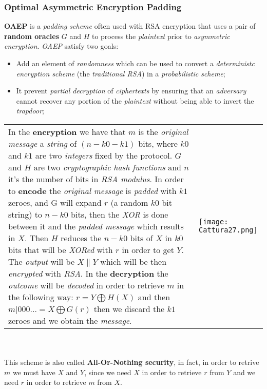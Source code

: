 \documentclass{article}
\begin{document}
\subsubsection{Optimal Asymmetric Encryption Padding}
\textbf{OAEP} is a \emph{padding scheme} often used with RSA encryption that uses a pair of \textbf{random oracles} $G$ and $H$ to process the \emph{plaintext} prior to \emph{asymmetric encryption}. \emph{OAEP} satisfy two goals:
\begin{itemize}
\item Add an element of \emph{randomness} which can be used to convert a \emph{deterministc encryption scheme} (the \emph{traditional RSA}) in a \emph{probabilistic scheme};
\item It prevent \emph{partial decryption} of \emph{ciphertexts} by ensuring that an \emph{adversary} cannot recover any portion of the \emph{plaintext} without being able to invert the \emph{trapdoor};
\end{itemize}
\begin{tabular}{C{10cm}  L{10.5cm}}
In the \textbf{encryption} we have that $m$ is the \emph{original message} a \emph{string} of $(n-k0-k1)$ bits, where $k0$ and $k1$ are two \emph{integers} fixed by the protocol. $G$ and $H$ are two \emph{cryptographic hash functions} and $n$ it's the number of bits in \emph{RSA modulus}. In order to \textbf{encode} the \emph{original message} is \emph{padded} with $k1$ zeroes, and G will expand $r$ (a random $k0$ bit string) to $n-k0$ bits, then the \emph{XOR} is done between it and the \emph{padded message} which results in $X$. Then $H$ reduces the $n-k0$ bits of $X$ in $k0$ bits that will be \emph{XORed} with $r$ in order to get $Y$. The \emph{output} will be $X\parallel Y$ which will be then \emph{encrypted} with \emph{RSA}. In the \textbf{decryption} the \emph{outcome} will be \emph{decoded} in order to retrieve $m$ in the following way: $r= Y \bigoplus H(X)$ and then $m |000... = X \bigoplus G(r)$ then we discard the $k1$ zeroes and we obtain the \emph{message}. & \texttt{[image: Cattura27.png]} 
\end{tabular}\\\\
This scheme is also called \textbf{All-Or-Nothing security}, in fact, in order to retrive $m$ we must have $X$ and $Y$, since we need $X$ in order to retrieve $r$ from $Y$ and we need $r$ in order to retrieve $m$ from $X$. 
\end{document}
